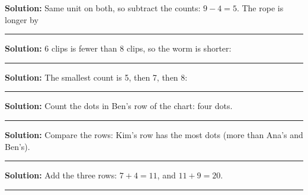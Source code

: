 \documentclass[12pt]{article}
\begin{document}



\textbf{Solution:} Same unit on both, so subtract the counts: $9 - 4 = 5$.
The rope is longer by 

\vspace{0.2cm}\noindent\rule{\linewidth}{0.2pt}\vspace{0.1cm}


\textbf{Solution:} 6 clips is fewer than 8 clips, so the worm is shorter:

\vspace{0.2cm}\noindent\rule{\linewidth}{0.2pt}\vspace{0.1cm}


\textbf{Solution:} The smallest count is 5, then 7, then 8:

\vspace{0.2cm}\noindent\rule{\linewidth}{0.2pt}\vspace{0.1cm}


\textbf{Solution:} Count the dots in Ben's row of the chart: four dots.

\vspace{0.2cm}\noindent\rule{\linewidth}{0.2pt}\vspace{0.1cm}


\textbf{Solution:} Compare the rows: Kim's row has the most dots (more than
Ana's and Ben's). 

\vspace{0.2cm}\noindent\rule{\linewidth}{0.2pt}\vspace{0.1cm}


\textbf{Solution:} Add the three rows: $7 + 4 = 11$, and $11 + 9 = 20$.

\vspace{0.2cm}\noindent\rule{\linewidth}{0.2pt}\vspace{0.1cm}
\end{document}
